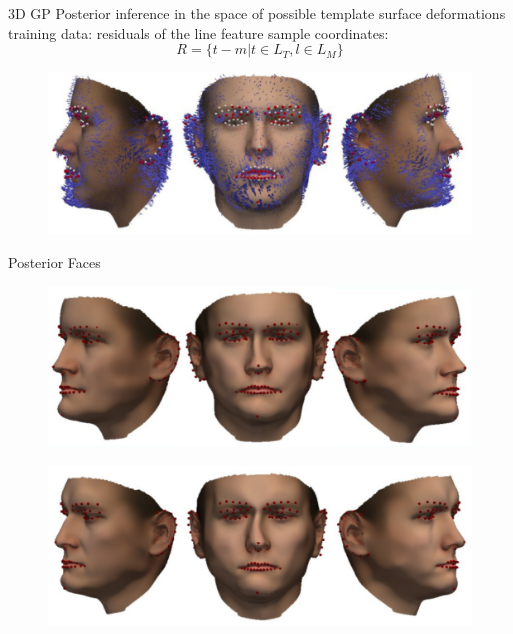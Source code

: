 \documentclass[xcolor=x11names,compress]{beamer}
\begin{document}
\begin{frame}{3D GP Posterior}
inference in the space of possible template surface deformations\\
training data: residuals of the line feature sample coordinates:        
\begin{equation*}
R = \{t - m \vert t \in L_{T}, l \in L_{M}\} 
\end{equation*}
\begin{figure}   
\centering
\includegraphics[width=.8\textwidth]{../resources/img/posterior_deformations.pdf}
\end{figure}

\end{frame}

\begin{frame}{Posterior Faces}
    \begin{figure}
        \centering
        \includegraphics[width=.9\textwidth]{../resources/img/posterior_sample_17.pdf}
    \end{figure}
    \begin{figure}
        \centering
        \includegraphics[width=.9\textwidth]{../resources/img/posterior_sample_23.pdf}
    \end{figure}
\end{frame}
\end{document}
